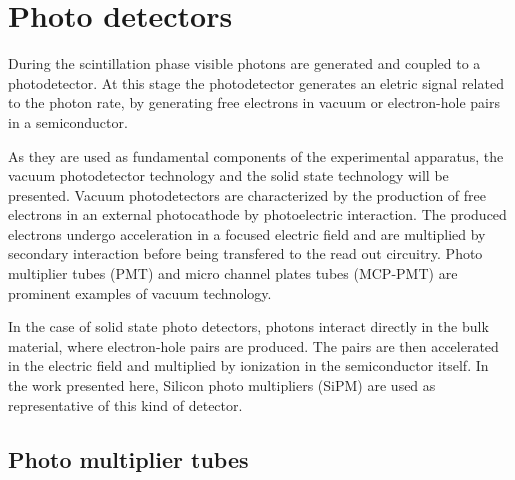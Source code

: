
\chapter{Photo detectors}
During the scintillation phase visible photons are generated and coupled to a photodetector. At this stage the photodetector generates an eletric signal related to the photon rate, by generating free electrons in vacuum or electron-hole pairs in a semiconductor.

As they are used as fundamental components of the experimental apparatus, the vacuum photodetector technology and the solid state technology will be presented.
Vacuum photodetectors are characterized by the production of free electrons in an external photocathode by photoelectric interaction. The produced electrons undergo acceleration in a focused electric field and are multiplied by secondary interaction before being transfered to the read out circuitry. Photo multiplier tubes (PMT) and micro channel plates tubes  (MCP-PMT) are prominent examples of vacuum technology.
  
In the case of solid state photo detectors, photons interact directly in the bulk material, where electron-hole pairs are produced. The pairs are then accelerated in the electric field and multiplied by ionization in the semiconductor itself. In the work presented here, Silicon photo multipliers (SiPM) are used as representative of this kind of detector.     

\section{Photo multiplier tubes}

